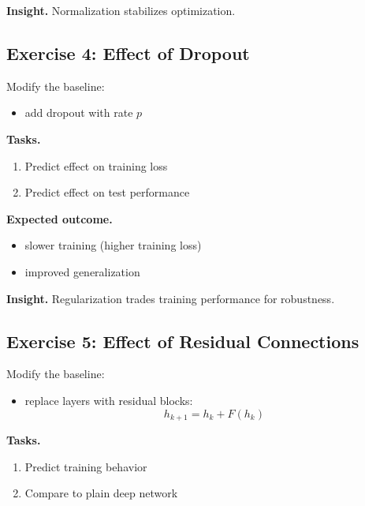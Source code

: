 \medskip

\noindent
\textbf{Insight.}  
Normalization stabilizes optimization.

\subsection{Exercise 4: Effect of Dropout}

Modify the baseline:

\begin{itemize}
    \item add dropout with rate $p$
\end{itemize}

\medskip

\noindent
\textbf{Tasks.}
\begin{enumerate}
    \item Predict effect on training loss
    \item Predict effect on test performance
\end{enumerate}

\medskip

\noindent
\textbf{Expected outcome.}

\begin{itemize}
    \item slower training (higher training loss)
    \item improved generalization
\end{itemize}

\medskip

\noindent
\textbf{Insight.}  
Regularization trades training performance for robustness.

\subsection{Exercise 5: Effect of Residual Connections}

Modify the baseline:

\begin{itemize}
    \item replace layers with residual blocks:
    \[
    h_{k+1} = h_k + F(h_k)
    \]
\end{itemize}

\medskip

\noindent
\textbf{Tasks.}
\begin{enumerate}
    \item Predict training behavior
    \item Compare to plain deep network
\end{enumerate}

